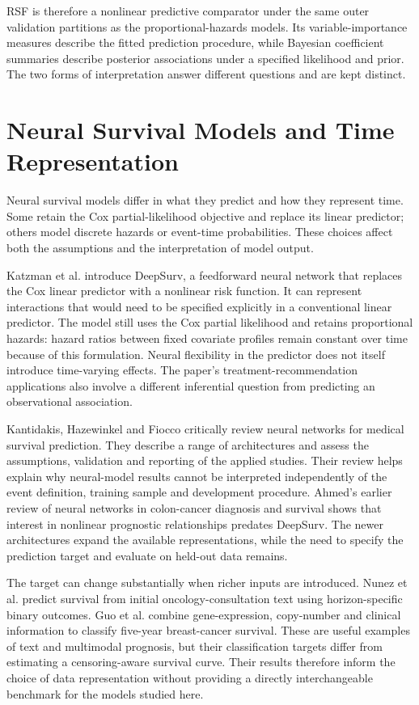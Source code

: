 RSF is therefore a nonlinear predictive comparator under the same outer validation partitions as the proportional-hazards models. Its variable-importance measures describe the fitted prediction procedure, while Bayesian coefficient summaries describe posterior associations under a specified likelihood and prior. The two forms of interpretation answer different questions and are kept distinct.

\section{Neural Survival Models and Time Representation}\label{neural-survival-models-and-time-representation}

Neural survival models differ in what they predict and how they represent time. Some retain the Cox partial-likelihood objective and replace its linear predictor; others model discrete hazards or event-time probabilities. These choices affect both the assumptions and the interpretation of model output.

Katzman et al. \cite{ref4} introduce DeepSurv, a feedforward neural network that replaces the Cox linear predictor with a nonlinear risk function. It can represent interactions that would need to be specified explicitly in a conventional linear predictor. The model still uses the Cox partial likelihood and retains proportional hazards: hazard ratios between fixed covariate profiles remain constant over time because of this formulation. Neural flexibility in the predictor does not itself introduce time-varying effects. The paper's treatment-recommendation applications also involve a different inferential question from predicting an observational association.

Kantidakis, Hazewinkel and Fiocco \cite{ref5} critically review neural networks for medical survival prediction. They describe a range of architectures and assess the assumptions, validation and reporting of the applied studies. Their review helps explain why neural-model results cannot be interpreted independently of the event definition, training sample and development procedure. Ahmed's earlier review of neural networks in colon-cancer diagnosis and survival \cite{ref10} shows that interest in nonlinear prognostic relationships predates DeepSurv. The newer architectures expand the available representations, while the need to specify the prediction target and evaluate on held-out data remains.

The target can change substantially when richer inputs are introduced. Nunez et al. \cite{ref11} predict survival from initial oncology-consultation text using horizon-specific binary outcomes. Guo et al. \cite{ref48} combine gene-expression, copy-number and clinical information to classify five-year breast-cancer survival. These are useful examples of text and multimodal prognosis, but their classification targets differ from estimating a censoring-aware survival curve. Their results therefore inform the choice of data representation without providing a directly interchangeable benchmark for the models studied here.

